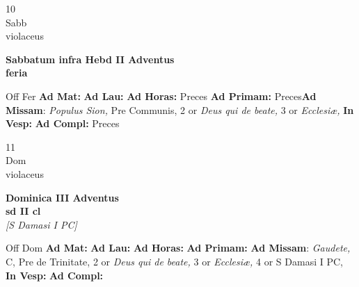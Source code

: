 \documentclass[10pt, openany]{book}
\begin{document}
        \begin{center}
            \begin{minipage}{3.5in}
                \vspace{2em}
                \begin{minipage}{0.5in}
                    {\Huge 10} \\
                    {\normalsize Sabb} \\
                    {\normalsize violaceus}
                \end{minipage}
                \begin{minipage}{3.0in}
                    \textbf{ \large Sabbatum infra Hebd II Adventus \\
                    \textnormal{\normalsize feria}} \\ 
                \end{minipage}
                \begin{justify}Off Fer
                    \textbf{Ad Mat: }
                    \textbf{Ad Lau: }
                    \textbf{Ad Horas: }Preces
                    \textbf{Ad Primam: }Preces\textbf{Ad Missam}: \textit{Populus Sion,} Pre Communis, 2 or \textit{Deus qui de beate,} 3 or \textit{Ecclesiæ,}  
                    \textbf{In Vesp: }
                    \textbf{Ad Compl: }Preces
                \end{justify}
            \end{minipage}
        \end{center}
    
        \begin{center}
            \begin{minipage}{3.5in}
                \vspace{2em}
                \begin{minipage}{0.5in}
                    {\Huge 11} \\
                    {\normalsize Dom} \\
                    {\normalsize violaceus}
                \end{minipage}
                \begin{minipage}{3.0in}
                    \textbf{ \large Dominica III Adventus \\
                    \textnormal{\normalsize sd II cl}} \\ \textit{[S Damasi I PC]} \\ 
                \end{minipage}
                \begin{justify}Off Dom
                    \textbf{Ad Mat: }
                    \textbf{Ad Lau: }
                    \textbf{Ad Horas: }
                    \textbf{Ad Primam: }\textbf{Ad Missam}: \textit{Gaudete,} C, Pre de Trinitate, 2 or \textit{Deus qui de beate,} 3 or \textit{Ecclesiæ,} 4 or S Damasi I PC,  
                    \textbf{In Vesp: }
                    \textbf{Ad Compl: }
                \end{justify}
            \end{minipage}
        \end{center}
    
\end{document}
